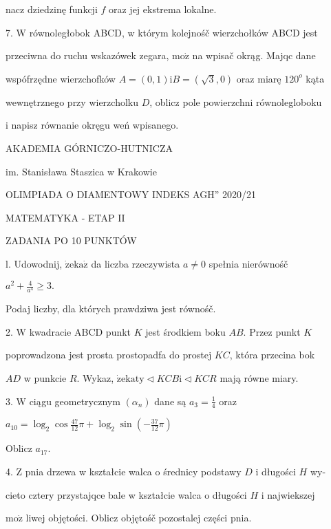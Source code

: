 \documentclass[a4paper,12pt]{article}
\begin{document}
nacz dziedzinę funkcji $f$ oraz jej ekstrema lokalne.

7. $\mathrm{W}$ równoległobok ABCD, w którym kolejnośč wierzchołków ABCD jest

przeciwna do ruchu wskazówek zegara, $\mathrm{m}\mathrm{o}\dot{\mathrm{z}}$ na wpisač okrąg. Majqc dane

wspófrzędne wierzchofków $A= (0,1) \mathrm{i}B= (\sqrt{3},0)$ oraz miarę $120^{o}$ kąta

wewnętrznego przy wierzcholku $D$, oblicz pole powierzchni równolegloboku

i napisz równanie okręgu weń wpisanego.






AKADEMIA GÓRNICZO-HUTNICZA

im. Stanisława Staszica w Krakowie

OLIMPIADA O DIAMENTOWY INDEKS AGH'' 2020/21

MATEMATYKA - ETAP II

ZADANIA PO 10 PUNKTÓW

l. Udowodnij, $\dot{\mathrm{z}}\mathrm{e}\mathrm{k}\mathrm{a}\dot{\mathrm{z}}$ da liczba rzeczywista $a\neq 0$ spełnia nierównośč

$a^{2}+\displaystyle \frac{4}{a^{4}}\geq 3.$

Podaj liczby, dla których prawdziwa jest równośč.

2. $\mathrm{W}$ kwadracie ABCD punkt $K$ jest środkiem boku $AB$. Przez punkt $K$

poprowadzona jest prosta prostopadfa do prostej $KC$, która przecina bok

$AD$ w punkcie $R$. Wykaz, $\dot{\mathrm{z}}\mathrm{e}\mathrm{k}\mathrm{a}\mathrm{t}\mathrm{y}\triangleleft KCB\mathrm{i}\triangleleft KCR$ mają równe miary.

3. $\mathrm{W}$ ciągu geometrycznym $(\alpha_{n})$ dane są $a_{3}=\displaystyle \frac{1}{4}$ oraz

$a_{10}=\displaystyle \log_{2}\cos\frac{47}{12}\pi+\log_{2}\sin(-\frac{37}{12}\pi)$

Oblicz $a_{17}.$

4. $\mathrm{Z}$ pnia drzewa w kształcie walca o średnicy podstawy $D$ i długości $H$ wy-

cieto cztery przystajqce bale w kształcie walca o długości $H$ i najwiekszej

$\mathrm{m}\mathrm{o}\dot{\mathrm{z}}$ liwej objętości. Oblicz objętośč pozostalej części pnia.
\end{document}
